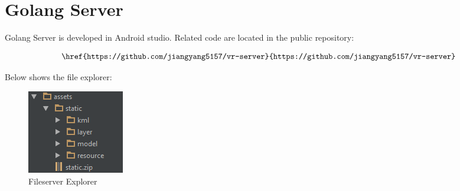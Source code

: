 \label{appendix-golang-server}
\chapter{Golang Server}

Golang Server is developed in Android studio. Related code are located in the public repository:

\[
\begin{array}{lr}
\begin{aligned}
&\code{\href{https://github.com/jiangyang5157/vr-server}{https://github.com/jiangyang5157/vr-server}}\\
\end{aligned}
\end{array}
\]

Below shows the file explorer:

\begin{figure}[H]
\caption{Fileserver Explorer}
\label{fig:server-fileserver}
\centering
\includegraphics[]{Figures/server-fileserver.png}
\decoRule
\end{figure}

